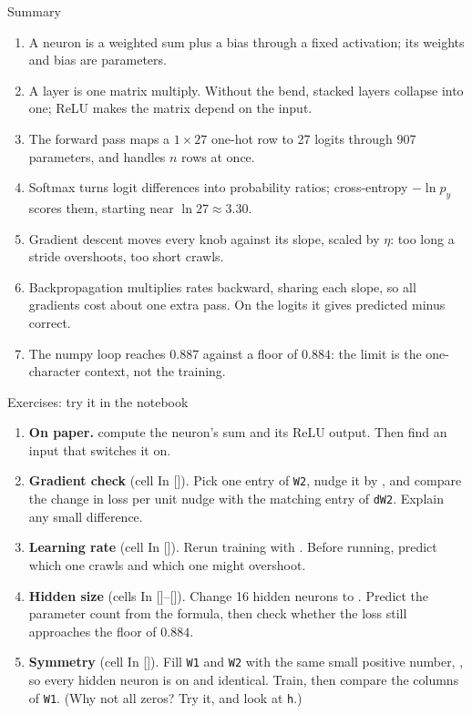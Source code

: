 \documentclass[aspectratio=169,11pt,t,\primeropts]{beamer}
\begin{document}
\begin{frame}{Summary}
  \begin{enumerate}\small
    \item A neuron is a weighted sum plus a bias through a fixed activation; its weights and bias
      are parameters.
    \item A layer is one matrix multiply. Without the bend, stacked layers collapse into one;
      ReLU makes the matrix depend on the input.
    \item The forward pass maps a $1 \times 27$ one-hot row to 27 logits through 907 parameters,
      and handles $n$ rows at once.
    \item Softmax turns logit differences into probability ratios; cross-entropy $-\ln p_y$
      scores them, starting near $\ln 27 \approx 3.30$.
    \item Gradient descent moves every knob against its slope, scaled by $\eta$: too long a stride
      overshoots, too short crawls.
    \item Backpropagation multiplies rates backward, sharing each slope, so all gradients cost
      about one extra pass. On the logits it gives predicted minus correct.
    \item The numpy loop reaches $0.887$ against a floor of $0.884$: the limit is the
      one-character context, not the training.
  \end{enumerate}
\end{frame}

\begin{frame}{Exercises: try it in the notebook}
  \small
  \begin{enumerate}
    \item \textbf{On paper.}  compute the
      neuron's sum and its ReLU output. Then find an input that switches it on.
    \item \textbf{Gradient check} (cell In []). Pick one entry of \texttt{W2},
      nudge it by , and compare the change in loss per unit nudge with the
      matching entry of \texttt{dW2}. Explain any small difference.
    \item \textbf{Learning rate} (cell In []). Rerun training with
      . Before running, predict which one crawls and which
      one might overshoot.
    \item \textbf{Hidden size} (cells In []--[]). Change 16 hidden
      neurons to . Predict the parameter count from the formula, then check
      whether the loss still approaches the floor of $0.884$.
    \item \textbf{Symmetry} (cell In []). Fill \texttt{W1} and \texttt{W2} with
      the same small positive number, , so every hidden neuron is on and identical.
      Train, then compare the columns of \texttt{W1}. (Why not all zeros? Try it, and look at
      \texttt{h}.)
  \end{enumerate}
\end{frame}
\end{document}
